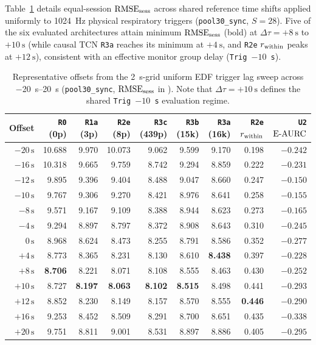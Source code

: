 Table~\ref{tab:app_lag_sweep} details equal-session $\mathrm{RMSE}_{\mathrm{sess}}$ across shared reference time shifts
applied uniformly to \SI{1024}{\hertz} physical respiratory triggers (\texttt{pool30\_sync}, $S=28$).
Five of the six evaluated architectures attain minimum $\mathrm{RMSE}_{\mathrm{sess}}$ (bold) at
$\Delta\tau = +\SI{8}{\second}$ to $+\SI{10}{\second}$ (while causal TCN \texttt{R3a} reaches
its minimum at $+\SI{4}{\second}$, and \texttt{R2e} $r_{\mathrm{within}}$ peaks at $+\SI{12}{\second}$),
consistent with an effective monitor group delay (\texttt{Trig $-10$\,s}).

\begin{table}[htbp]
  \centering
  \footnotesize
  \setlength{\tabcolsep}{4pt}
  \caption{Representative offsets from the \SI{2}{\second}-grid uniform EDF trigger lag sweep
  across \SIrange{-20}{+20}{\second} (\texttt{pool30\_sync}, $\mathrm{RMSE}_{\mathrm{sess}}$ in \si{\bpm}). Note that
  $\Delta\tau = +\SI{10}{\second}$ defines the shared \texttt{Trig $-10$\,s} evaluation regime.}
  \label{tab:app_lag_sweep}
  \begin{tabular*}{\textwidth}{@{\extracolsep{\fill}}r rrrrrr rr@{}}
    \toprule
    Offset & \texttt{R0} (0p) & \texttt{R1a} (3p) & \texttt{R2e} (8p) & \texttt{R3c} (439p) & \texttt{R3b} (15k) & \texttt{R3a} (16k) & \texttt{R2e} $r_{\mathrm{within}}$ & \texttt{U2} $\mathrm{E\text{-}AURC}$ \\
    \midrule
    $-20\,\mathrm{s}$ & 10.688 & 9.970 & 10.073 & 9.062 & 9.599 & 9.170 & 0.198 & $-0.242$ \\
    $-16\,\mathrm{s}$ & 10.318 & 9.665 &  9.759 & 8.742 & 9.294 & 8.859 & 0.222 & $-0.231$ \\
    $-12\,\mathrm{s}$ &  9.895 & 9.396 &  9.404 & 8.488 & 9.047 & 8.660 & 0.247 & $-0.150$ \\
    $-10\,\mathrm{s}$ &  9.767 & 9.306 &  9.270 & 8.421 & 8.976 & 8.641 & 0.258 & $-0.155$ \\
    $-8\,\mathrm{s}$  &  9.571 & 9.167 &  9.109 & 8.388 & 8.944 & 8.623 & 0.273 & $-0.165$ \\
    $-4\,\mathrm{s}$  &  9.294 & 8.897 &  8.797 & 8.372 & 8.908 & 8.643 & 0.310 & $-0.245$ \\
    $0\,\mathrm{s}$   &  8.968 & 8.624 &  8.473 & 8.255 & 8.791 & 8.586 & 0.352 & $-0.277$ \\
    $+4\,\mathrm{s}$  &  8.773 & 8.365 &  8.231 & 8.130 & 8.610 & \textbf{8.438} & 0.397 & $-0.228$ \\
    $+8\,\mathrm{s}$  &  \textbf{8.706} & 8.221 & 8.071 & 8.108 & 8.555 & 8.463 & 0.430 & $-0.252$ \\
    \textbf{$+10\,\mathrm{s}$} & 8.727 & \textbf{8.197} & \textbf{8.063} & \textbf{8.102} & \textbf{8.515} & 8.498 & 0.441 & $-0.293$ \\
    $+12\,\mathrm{s}$ &  8.852 & 8.230 &  8.149 & 8.157 & 8.570 & 8.555 & \textbf{0.446} & $-0.290$ \\
    $+16\,\mathrm{s}$ &  9.253 & 8.452 &  8.509 & 8.291 & 8.700 & 8.651 & 0.435 & \textbf{$-0.338$} \\
    $+20\,\mathrm{s}$ &  9.751 & 8.811 &  9.001 & 8.531 & 8.897 & 8.886 & 0.405 & $-0.295$ \\
    \bottomrule
  \end{tabular*}
\end{table}

